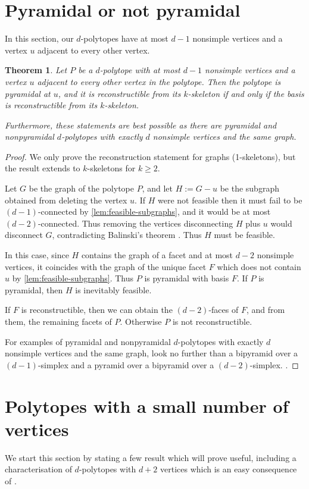 \documentclass[a4paper]{amsart}
\newtheorem{theorem}{Theorem}
\theoremstyle{definition}
\theoremstyle{remark}
\begin{document}
\section{Pyramidal or not pyramidal} In this section, our $d$-polytopes have at most $d-1$ nonsimple vertices and a vertex $u$ adjacent to every other vertex.

\begin{theorem} \label{thm:pyramidRec} Let $P$ be a $d$-polytope with at most $d-1$ nonsimple vertices and a vertex $u$ adjacent to every other vertex in the polytope. Then the polytope is pyramidal at $u$, and it is reconstructible from its $k$-skeleton if and only if the basis is reconstructible from its $k$-skeleton. 

Furthermore, these statements are best possible as there are pyramidal and nonpyramidal $d$-polytopes with exactly $d$ nonsimple vertices and the same graph.\end{theorem}

\begin{proof} We only prove the reconstruction statement for graphs (1-skeletons), but the result extends to $k$-skeletons for $k\ge 2$. 

Let $G$ be the graph of the polytope $P$, and let $H:=G-u$ be the subgraph obtained from deleting the vertex $u$. If $H$ were not feasible then it must fail to be $(d-1)$-connected by \cref{lem:feasible-subgraphs}, and it would be at most $(d-2)$-connected. Thus removing the vertices disconnecting $H$ plus $u$ would disconnect  $G$, contradicting Balinski's theorem \cite[Sec.~3.4]{Zie95}. Thus $H$ must be feasible.

In this case, since $H$ contains the graph of a facet and at most $d-2$ nonsimple vertices, it coincides with the graph of the unique facet $F$ which does not contain $u$ by \cref{lem:feasible-subgraphs}. Thus $P$ is pyramidal with basis $F$. If $P$ is pyramidal, then $H$ is inevitably feasible. 

If $F$ is reconstructible, then we can obtain the $(d-2)$-faces of $F$, and from them, the remaining facets of $P$. Otherwise $P$ is not reconstructible. 

For examples of pyramidal and nonpyramidal $d$-polytopes with exactly $d$ nonsimple vertices and the same graph, look no further than a bipyramid over a $(d-1)$-simplex and a pyramid over a bipyramid over a $(d-2)$-simplex. .
\end{proof}

	
\section{Polytopes with a small number of vertices} 
We start this section by stating a few result which will prove useful, including a characterisation of $d$-polytopes with $d+2$ vertices which is an easy consequence of \cite[Sec.~6.1]{Gru03}.
\end{document}
